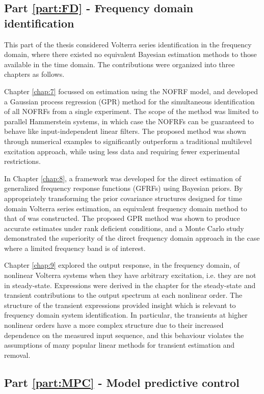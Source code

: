 \subsection{Part \ref{part:FD} - Frequency domain identification}

This part of the thesis considered Volterra series identification in the frequency domain, where there existed no equivalent Bayesian estimation methods to those available in the time domain. The contributions were organized into three chapters as follows.

Chapter \ref{chap:7} focussed on estimation using the NOFRF model, and developed a Gaussian process regression (GPR) method for the simultaneous identification of all NOFRFs from a single experiment. The scope of the method was limited to parallel Hammerstein systems, in which case the NOFRFs can be guaranteed to behave like input-independent linear filters. The proposed method was shown through numerical examples to significantly outperform a traditional multilevel excitation approach, while using less data and requiring fewer experimental restrictions.

In Chapter \ref{chap:8}, a framework was developed for the direct estimation of generalized frequency response functions (GFRFs) using Bayesian priors. By appropriately transforming the prior covariance structures designed for time domain Volterra series estimation, an equivalent frequency domain method to that of \cite{Birpoutsoukis2017} was constructed. The proposed GPR method was shown to produce accurate estimates under rank deficient conditions, and a Monte Carlo study demonstrated the superiority of the direct frequency domain approach in the case where a limited frequency band is of interest.

Chapter \ref{chap:9} explored the output response, in the frequency domain, of nonlinear Volterra systems when they have arbitrary excitation, i.e. they are not in steady-state. Expressions were derived in the chapter for the steady-state and transient contributions to the output spectrum at each nonlinear order. The structure of the transient expressions provided insight which is relevant to frequency domain system identification. In particular, the transients at higher nonlinear orders have a more complex structure due to their increased dependence on the measured input sequence, and this behaviour violates the assumptions of many popular linear methods for transient estimation and removal. 

\subsection{Part \ref{part:MPC} - Model predictive control}

